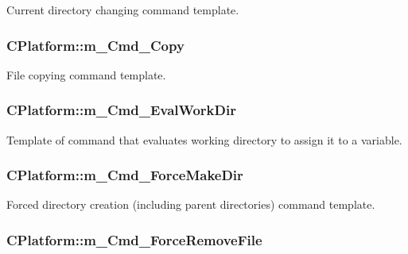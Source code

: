 Current directory changing command template. 

\hypertarget{classCPlatform_af87b0091e9dcee0e979d88ce2e236c3e}{
\subsubsection[{m\-\_\-\-Cmd\-\_\-\-Copy}]{\setlength{\rightskip}{0pt plus 5cm}C\-Platform\-::m\-\_\-\-Cmd\-\_\-\-Copy\hspace{0.3cm}{\ttfamily [private]}}}\label{classCPlatform_af87b0091e9dcee0e979d88ce2e236c3e}


File copying command template. 

\hypertarget{classCPlatform_a3e29909e2f0126abea8612a574e94f87}{
\subsubsection[{m\-\_\-\-Cmd\-\_\-\-Eval\-Work\-Dir}]{\setlength{\rightskip}{0pt plus 5cm}C\-Platform\-::m\-\_\-\-Cmd\-\_\-\-Eval\-Work\-Dir\hspace{0.3cm}{\ttfamily [private]}}}\label{classCPlatform_a3e29909e2f0126abea8612a574e94f87}


Template of command that evaluates working directory to assign it to a variable. 

\hypertarget{classCPlatform_a741615f88717233a4f78600b7588415b}{
\subsubsection[{m\-\_\-\-Cmd\-\_\-\-Force\-Make\-Dir}]{\setlength{\rightskip}{0pt plus 5cm}C\-Platform\-::m\-\_\-\-Cmd\-\_\-\-Force\-Make\-Dir\hspace{0.3cm}{\ttfamily [private]}}}\label{classCPlatform_a741615f88717233a4f78600b7588415b}


Forced directory creation (including parent directories) command template. 

\hypertarget{classCPlatform_a7e9d60712f9a6cb191322f82fe16d6d1}{
\subsubsection[{m\-\_\-\-Cmd\-\_\-\-Force\-Remove\-File}]{\setlength{\rightskip}{0pt plus 5cm}C\-Platform\-::m\-\_\-\-Cmd\-\_\-\-Force\-Remove\-File\hspace{0.3cm}{\ttfamily [private]}}}\label{classCPlatform_a7e9d60712f9a6cb191322f82fe16d6d1}


